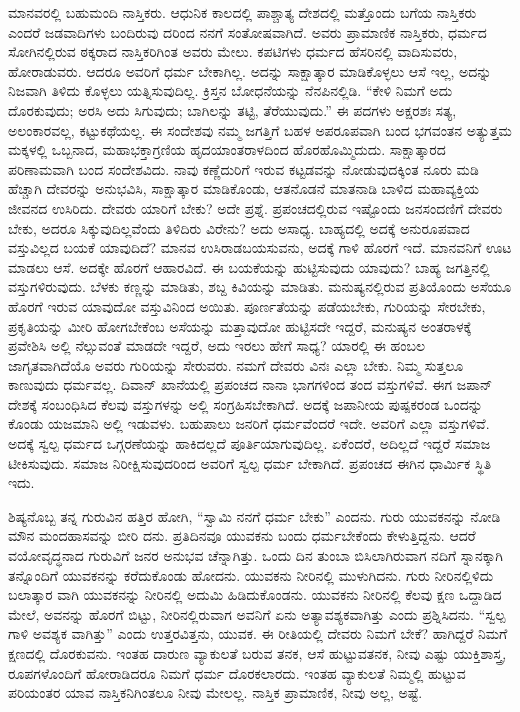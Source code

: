 ಮಾನವರಲ್ಲಿ ಬಹುಮಂದಿ ನಾಸ್ತಿಕರು. ಆಧುನಿಕ ಕಾಲದಲ್ಲಿ ಪಾಶ್ಚಾತ್ಯ ದೇಶದಲ್ಲಿ ಮತ್ತೊಂದು ಬಗೆಯ ನಾಸ್ತಿಕರು ಎಂದರೆ ಜಡವಾದಿಗಳು ಬಂದಿರುವು ದರಿಂದ ನನಗೆ ಸಂತೋಷವಾಗಿದೆ. ಅವರು ಪ್ರಾಮಾಣಿಕ ನಾಸ್ತಿಕರು, ಧರ್ಮದ ಸೋಗಿನಲ್ಲಿರುವ ಠಕ್ಕರಾದ ನಾಸ್ತಿಕರಿಗಿಂತ ಅವರು ಮೇಲು. ಕಪಟಿಗಳು ಧರ್ಮದ ಹೆಸರಿನಲ್ಲಿ ವಾದಿಸುವರು, ಹೋರಾಡುವರು. ಆದರೂ ಅವರಿಗೆ ಧರ್ಮ ಬೇಕಾಗಿಲ್ಲ. ಅದನ್ನು ಸಾಕ್ಷಾತ್ಕಾರ ಮಾಡಿಕೊಳ್ಳಲು ಆಸೆ ಇಲ್ಲ, ಅದನ್ನು ನಿಜವಾಗಿ ತಿಳಿದು ಕೊಳ್ಳಲು ಯತ್ನಿಸುವುದಿಲ್ಲ. ಕ್ರಿಸ್ತನ ಬೋಧನೆಯನ್ನು ನೆನಪಿನಲ್ಲಿಡಿ. “ಕೇಳಿ ನಿಮಗೆ ಅದು ದೊರಕುವುದು; ಅರಸಿ ಅದು ಸಿಗುವುದು; ಬಾಗಿಲನ್ನು ತಟ್ಟಿ, ತೆರೆಯುವುದು.” ಈ ಪದಗಳು ಅಕ್ಷರಶಃ ಸತ್ಯ, ಅಲಂಕಾರವಲ್ಲ, ಕಟ್ಟುಕಥೆಯಲ್ಲ. ಈ ಸಂದೇಶವು ನಮ್ಮ ಜಗತ್ತಿಗೆ ಬಹಳ ಅಪರೂಪವಾಗಿ ಬಂದ ಭಗವಂತನ ಅತ್ಯುತ್ತಮ ಮಕ್ಕಳಲ್ಲಿ ಒಬ್ಬನಾದ, ಮಹಾಭಕ್ತಾಗ್ರಣಿಯ ಹೃದಯಾಂತರಾಳದಿಂದ ಹೊರಹೊಮ್ಮಿದುದು. ಸಾಕ್ಷಾತ್ಕಾರದ ಪರಿಣಾಮವಾಗಿ ಬಂದ ಸಂದೇಶವಿದು. ನಾವು ಕಣ್ಣೆದುರಿಗೆ ಇರುವ ಕಟ್ಟಡವನ್ನು ನೋಡುವುದಕ್ಕಿಂತ ನೂರು ಮಡಿ ಹೆಚ್ಚಾಗಿ ದೇವರನ್ನು ಅನುಭವಿಸಿ, ಸಾಕ್ಷಾತ್ಕಾರ ಮಾಡಿಕೊಂಡು, ಆತನೊಡನೆ ಮಾತನಾಡಿ ಬಾಳಿದ ಮಹಾವ್ಯಕ್ತಿಯ ಜೀವನದ ಉಸಿರಿದು. ದೇವರು ಯಾರಿಗೆ ಬೇಕು? ಅದೇ ಪ್ರಶ್ನೆ. ಪ್ರಪಂಚದಲ್ಲಿರುವ ಇಷ್ಟೊಂದು ಜನಸಂದಣಿಗೆ ದೇವರು ಬೇಕು, ಅದರೂ ಸಿಕ್ಕುವುದಿಲ್ಲವೆಂದು ತಿಳಿದಿರು ವಿರೇನು? ಅದು ಅಸಾಧ್ಯ. ಬಾಹ್ಯದಲ್ಲಿ ಅದಕ್ಕೆ ಅನುರೂಪವಾದ ವಸ್ತುವಿಲ್ಲದ ಬಯಕೆ ಯಾವುದಿದೆ? ಮಾನವ ಉಸಿರಾಡಬಯಸುವನು, ಅದಕ್ಕೆ ಗಾಳಿ ಹೊರಗೆ ಇದೆ. ಮಾನವನಿಗೆ ಊಟ ಮಾಡಲು ಆಸೆ. ಅದಕ್ಕೇ ಹೊರಗೆ ಆಹಾರವಿದೆ. ಈ ಬಯಕೆಯನ್ನು ಹುಟ್ಟಿಸುವುದು ಯಾವುದು? ಬಾಹ್ಯ ಜಗತ್ತಿನಲ್ಲಿ ವಸ್ತುಗಳಿರುವುದು. ಬೆಳಕು ಕಣ್ಣನ್ನು ಮಾಡಿತು, ಶಬ್ದ ಕಿವಿಯನ್ನು ಮಾಡಿತು. ಮನುಷ್ಯನಲ್ಲಿರುವ ಪ್ರತಿಯೊಂದು ಅಸೆಯೂ ಹೊರಗೆ ಇರುವ ಯಾವುದೋ ವಸ್ತುವಿನಿಂದ ಅಯಿತು. ಪೂರ್ಣತೆಯನ್ನು ಪಡೆಯಬೇಕು, ಗುರಿಯನ್ನು ಸೇರಬೇಕು, ಪ್ರಕೃತಿಯನ್ನು ಮೀರಿ ಹೋಗಬೇಕೆಂಬ ಅಸೆಯನ್ನು ಮತ್ತಾವುದೋ ಹುಟ್ಟಿಸದೇ ಇದ್ದರೆ, ಮನುಷ್ಯನ ಅಂತರಾಳಕ್ಕೆ ಪ್ರವೇಶಿಸಿ ಅಲ್ಲಿ ನೆಲ್ಸುವಂತೆ ಮಾಡದೇ ಇದ್ದರೆ, ಅದು ಇರಲು ಹೇಗೆ ಸಾಧ್ಯ? ಯಾರಲ್ಲಿ ಈ ಹಂಬಲ ಜಾಗೃತವಾಗಿದೆಯೊ ಅವರು ಗುರಿಯನ್ನು ಸೇರುವರು. ನಮಗೆ ದೇವರು ವಿನಃ ಎಲ್ಲಾ ಬೇಕು. ನಿಮ್ಮ ಸುತ್ತಲೂ ಕಾಣುವುದು ಧರ್ಮವಲ್ಲ. ದಿವಾನ್​ ಖಾನೆಯಲ್ಲಿ ಪ್ರಪಂಚದ ನಾನಾ ಭಾಗಗಳಿಂದ ತಂದ ವಸ್ತುಗಳಿವೆ. ಈಗ ಜಪಾನ್​ ದೇಶಕ್ಕೆ ಸಂಬಂಧಿಸಿದ ಕೆಲವು ವಸ್ತುಗಳನ್ನು ಅಲ್ಲಿ ಸಂಗ್ರಹಿಸಬೇಕಾಗಿದೆ. ಅದಕ್ಕೆ ಜಪಾನೀಯ ಪುಷ್ಪಕರಂಡ ಒಂದನ್ನು ಕೊಂಡು ಯಜಮಾನಿ ಅಲ್ಲಿ ಇಡುವಳು. ಬಹುಪಾಲು ಜನರಿಗೆ ಧರ್ಮವೆಂದರೆ ಇದೇ. ಅವರಿಗೆ ಎಲ್ಲಾ ವಸ್ತುಗಳಿವೆ. ಅದಕ್ಕೆ ಸ್ವಲ್ಪ ಧರ್ಮದ ಒಗ್ಗರಣೆಯನ್ನು ಹಾಕಿದಲ್ಲದೆ ಪೂರ್ತಿಯಾಗುವುದಿಲ್ಲ. ಏಕೆಂದರೆ, ಅದಿಲ್ಲದೆ ಇದ್ದರೆ ಸಮಾಜ ಟೀಕಿಸುವುದು. ಸಮಾಜ ನಿರೀಕ್ಷಿಸುವುದರಿಂದ ಅವರಿಗೆ ಸ್ವಲ್ಪ ಧರ್ಮ ಬೇಕಾಗಿದೆ. ಪ್ರಪಂಚದ ಈಗಿನ ಧಾರ್ಮಿಕ ಸ್ಥಿತಿ ಇದು.

ಶಿಷ್ಯನೊಬ್ಬ ತನ್ನ ಗುರುವಿನ ಹತ್ತಿರ ಹೋಗಿ, “ಸ್ವಾಮಿ ನನಗೆ ಧರ್ಮ ಬೇಕು” ಎಂದನು. ಗುರು ಯುವಕನನ್ನು ನೋಡಿ ಮೌನ ಮಂದಹಾಸವನ್ನು ಬೀರಿ ದನು. ಪ್ರತಿದಿನವೂ ಯುವಕನು ಬಂದು ಧರ್ಮಬೇಕೆಂದು ಕೇಳುತ್ತಿದ್ದನು. ಆದರೆ ವಯೋವೃದ್ಧನಾದ ಗುರುವಿಗೆ ಜನರ ಅನುಭವ ಚೆನ್ನಾಗಿತ್ತು. ಒಂದು ದಿನ ತುಂಬಾ ಬಿಸಿಲಾಗಿರುವಾಗ ನದಿಗೆ ಸ್ನಾನಕ್ಕಾಗಿ ತನ್ನೊಂದಿಗೆ ಯುವಕನನ್ನು ಕರೆದುಕೊಂಡು ಹೋದನು. ಯುವಕನು ನೀರಿನಲ್ಲಿ ಮುಳುಗಿದನು. ಗುರು ನೀರಿನಲ್ಲಿಳಿದು ಬಲಾತ್ಕಾರ ವಾಗಿ ಯುವಕನನ್ನು ನೀರಿನಲ್ಲಿ ಅದುಮಿ ಹಿಡಿದುಕೊಂಡನು. ಯುವಕನು ನೀರಿನಲ್ಲಿ ಕೆಲವು ಕ್ಷಣ ಒದ್ದಾಡಿದ ಮೇಲೆ, ಅವನನ್ನು ಹೊರಗೆ ಬಿಟ್ಟು, ನೀರಿನಲ್ಲಿರುವಾಗ ಅವನಿಗೆ ಏನು ಅತ್ಯಾವಶ್ಯಕವಾಗಿತ್ತು ಎಂದು ಪ್ರಶ್ನಿಸಿದನು. “ಸ್ವಲ್ಪ ಗಾಳಿ ಅವಶ್ಯಕ ವಾಗಿತ್ತು” ಎಂದು ಉತ್ತರವಿತ್ತನು, ಯುವಕ. ಈ ರೀತಿಯಲ್ಲಿ ದೇವರು ನಿಮಗೆ ಬೇಕೆ? ಹಾಗಿದ್ದರೆ ನಿಮಗೆ ಕ್ಷಣದಲ್ಲಿ ದೊರಕುವನು. ಇಂತಹ ದಾರುಣ ವ್ಯಾಕುಲತೆ ಬರುವ ತನಕ, ಆಸೆ ಹುಟ್ಟುವತನಕ, ನೀವು ಎಷ್ಟು ಯುಕ್ತಿಶಾಸ್ತ್ರ, ರೂಪಗಳೊಂದಿಗೆ ಹೋರಾಡಿದರೂ ನಿಮಗೆ ಧರ್ಮ ದೊರಕಲಾರದು. ಇಂತಹ ವ್ಯಾಕುಲತೆ ನಿಮ್ಮಲ್ಲಿ ಹುಟ್ಟುವ ಪರಿಯಂತರ ಯಾವ ನಾಸ್ತಿಕನಿಗಿಂತಲೂ ನೀವು ಮೇಲಲ್ಲ. ನಾಸ್ತಿಕ ಪ್ರಾಮಾಣಿಕ, ನೀವು ಅಲ್ಲ, ಅಷ್ಟೆ.

